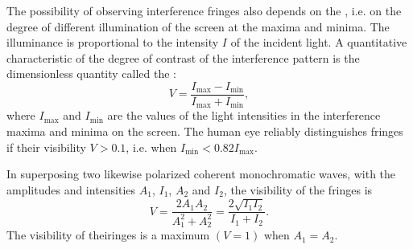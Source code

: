 The possibility of observing interference fringes also depends on the , i.e. on the degree of different illumination of the screen at the maxima and minima. The illuminance is proportional to the intensity $I$ of the incident light. A quantitative characteristic of the degree of contrast of the interference pattern is the dimensionless quantity called the :
\begin{equation*}%
V = \frac{I_{\text{max}} - I_{\text{min}}}{I_{\text{max}} + I_{\text{min}}},
\end{equation*}
where $I_{\text{max}}$ and $I_{\text{min}}$ are the values of the light intensities in the interference maxima and minima on the screen. The human eye reliably distinguishes fringes if their visibility $V > 0.1$, i.e. when $I_{\text{min}} < 0.82 I_{\text{max}}$.

In superposing two likewise polarized coherent monochromatic
waves, with the amplitudes and intensities $A_{1}$, $I_{1}$, $A_{2}$ and $I_{2}$, the visibility of the fringes is
\begin{equation*}%
V = \frac{2A_{1}A_{2}}{A_{1}^{2}+A_{2}^{2}} = \frac{2 \sqrt{I_{1}I_{2}}}{I_{1} + I_{2}}.
\end{equation*}
The visibility of theiringes is a maximum $(V = 1)$ when $A_{1} = A_{2}$.

